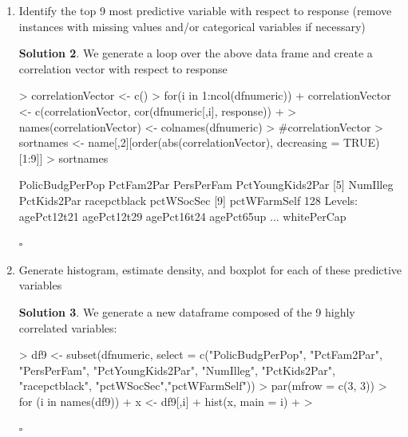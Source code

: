 \documentclass[twoside]{article}
\theoremstyle{definition}
\newtheorem*{solutionT}{Solution}
\newenvironment{solution}{\begin{cBox}\begin{solutionT}}{\hfill{\scriptsize\ensuremath{\square}}\end{solutionT}\end{cBox}}
\theoremstyle{definition}
\begin{document}
\begin{enumerate}
\begin{solution}
\end{solution}
\item Identify the top 9 most predictive variable with respect to response (remove instances
with missing values and/or categorical variables if necessary)
\begin{solution}
We generate a loop over the above data frame and create a correlation vector with respect to response
\begin{Schunk}
\begin{Sinput}
> correlationVector <- c()
> for(i in 1:ncol(dfnumeric)) {
+   correlationVector <- c(correlationVector, cor(dfnumeric[,i], response))
+ }
> names(correlationVector) <- colnames(dfnumeric)
> #correlationVector 
> sortnames <- name[,2][order(abs(correlationVector), decreasing = TRUE)[1:9]]
> sortnames
\end{Sinput}
\begin{Soutput}
[1] PolicBudgPerPop  PctFam2Par       PersPerFam       PctYoungKids2Par
[5] NumIlleg         PctKids2Par      racepctblack     pctWSocSec      
[9] pctWFarmSelf    
128 Levels: agePct12t21 agePct12t29 agePct16t24 agePct65up ... whitePerCap
\end{Soutput}
\end{Schunk}
\end{solution}
\item Generate histogram, estimate density, and boxplot for each of these predictive
variables 
\begin{solution}
We generate a new dataframe composed of the 9 highly correlated variables:
\begin{Schunk}
\begin{Sinput}
> df9 <- subset(dfnumeric, select = c("PolicBudgPerPop", "PctFam2Par", "PersPerFam", "PctYoungKids2Par", "NumIlleg", "PctKids2Par", "racepctblack", "pctWSocSec","pctWFarmSelf"))
> par(mfrow = c(3, 3))
> for (i in names(df9)) {
+   x <- df9[,i]
+   hist(x, main = i)
+ }
> 
\end{Sinput}
\end{Schunk}

\end{solution}
\end{enumerate}
\end{document}
